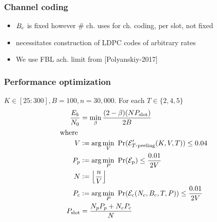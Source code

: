 \begin{frame}
\frametitle{Channel coding}
\begin{itemize}
\item $B_{\mathrm{c}}$ is fixed however $\#$ ch. uses for ch. coding, per slot, not fixed
\item necessitates construction of LDPC codes of arbitrary rates 
\item We use FBL ach. limit from [Polyanskiy-2017]
\end{itemize}
\end{frame}
\begin{frame}\frametitle{Performance optimization}
$K\in[25:300], B=100, n=30,000$. For each $T\in\{2,4,5\}$
\begin{align*}
\frac{E_b}{N_0}&=\min_{\beta} \frac{(2-\beta)(N  P_{\text{slot}})}{2B}\\
\text{ ~~where }&\\
V&\mathrel{\mathop:}= \arg\min_{V}~\Pr(\mathcal{E}'_{T\text{-peeling}}(K,V,T))\leq 0.04\\
P_p&\mathrel{\mathop:}= \arg\min_{P}~ \Pr(\mathcal{E}_{\mathrm{p}})\leq \frac{0.01}{2V}\\
N&\mathrel{\mathop:}=\left\lfloor \frac{n}{V}\right\rfloor\\
P_c&\mathrel{\mathop:}= \arg\min_{P}~\Pr(\mathcal{E}_{\mathrm{c}} (N_c,B_\mathrm{c},T,P))\leq \frac{0.01}{2V}\\
P_{\text{slot}}&=\frac{N_p P_p+ N_c P_c}{N}
\end{align*}
\end{frame}

\begin{frame}
\centering
\resizebox{0.7\textwidth}{!}{}
\end{frame}

